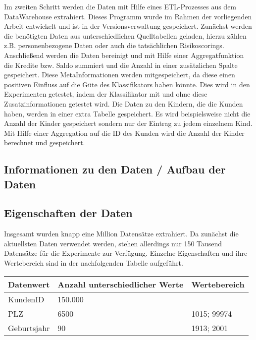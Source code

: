 Im zweiten Schritt werden die Daten mit Hilfe eines ETL-Prozesses aus dem DataWarehouse extrahiert. 
Dieses Programm wurde im Rahmen der vorliegenden Arbeit entwickelt und ist in der Versionsverwaltung gespeichert. 
Zunächst werden die benötigten Daten aus unterschiedlichen Quelltabellen %
geladen, hierzu zählen z.B. personenbezogene Daten oder auch die tatsächlichen Risikoscorings. 
Anschließend werden die Daten bereinigt und mit Hilfe einer Aggregatfunktion die Kredite bzw. Saldo summiert und die Anzahl in einer zusätzlichen Spalte gespeichert.
Diese MetaInformationen werden mitgespeichert, da diese einen positiven Einfluss auf die Güte des Klassifikators haben könnte. 
Dies wird in den Experimenten getestet, indem der Klassifikator mit und ohne diese Zusatzinformationen getestet wird. 
Die Daten zu den Kindern, die die Kunden haben, werden in einer extra Tabelle gespeichert.
Es wird beispielsweise nicht die Anzahl der Kinder gespeichert sondern nur der Eintrag zu jedem einzelnem Kind. 
Mit Hilfe einer Aggregation auf die ID des Kunden wird die Anzahl der Kinder berechnet und gespeichert. 



\subsection{Informationen zu den Daten / Aufbau der Daten}



\subsection{Eigenschaften der Daten}
Insgesamt wurden knapp eine Million Datensätze extrahiert. 
Da zunächst die aktuellsten Daten verwendet werden, stehen allerdings nur 150 Tausend Datensätze für die Experimente zur Verfügung. 
Einzelne Eigenschaften und ihre Wertebereich sind in der nachfolgenden Tabelle aufgeführt. 

\begin{tabular}[h]{l|l|l}
Datenwert & Anzahl unterschiedlicher Werte  & Wertebereich \\ \hline
KundenID & 150.000  &  \\ \hline
PLZ & 6500  & 1015; 99974 \\ \hline
Geburtsjahr & 90  & 1913; 2001 \\ 

\end{tabular}

